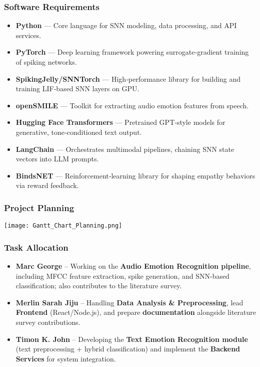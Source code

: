 \documentclass[aspectratio=169]{beamer}
\begin{document}
\begin{frame}
    \frametitle{Software Requirements}
    \begin{itemize}
        \item \textbf{Python} — Core language for SNN modeling, data processing, and API services.
        \item \textbf{PyTorch} — Deep learning framework powering surrogate‑gradient training of spiking networks.
        \item \textbf{SpikingJelly/SNNTorch} — High‑performance library for building and training LIF‑based SNN layers on GPU.
        \item \textbf{openSMILE} — Toolkit for extracting audio emotion features from speech.
        \item \textbf{Hugging Face Transformers} — Pretrained GPT‑style models for generative, tone‑conditioned text output.
        \item \textbf{LangChain} — Orchestrates multimodal pipelines, chaining SNN state vectors into LLM prompts.
        \item \textbf{BindsNET} — Reinforcement‑learning library for shaping empathy behaviors via reward feedback.
    \end{itemize}
\end{frame}

\begin{frame}
    \frametitle{Project Planning}
    \centering
    \texttt{[image: Gantt\_Chart\_Planning.png]}
\end{frame}

\begin{frame}
    \frametitle{ Task Allocation}
    \begin{itemize}
        \item \textbf{Marc George} –  Working on the \textbf{Audio Emotion Recognition pipeline}, including MFCC feature extraction, spike generation, and SNN-based classification; also contributes to the literature survey.
        
        \item \textbf{Merlin Sarah Jiju} – Handling \textbf{Data Analysis \& Preprocessing}, lead \textbf{Frontend } (React/Node.js), and prepare \textbf{documentation} alongside literature survey contributions.
        \item \textbf{Timon K. John} – Developing the \textbf{Text Emotion Recognition module} (text preprocessing + hybrid classification) and implement the \textbf{Backend Services} for system integration.
    \end{itemize}
\end{frame}
\end{document}
